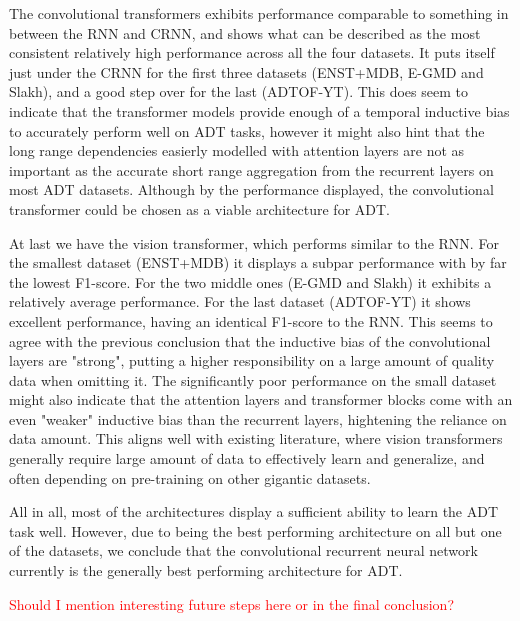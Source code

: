 The convolutional transformers exhibits performance comparable to something in between the \gls{RNN} and \gls{CRNN}, and shows what can be described as the most consistent relatively high performance across all the four datasets. It puts itself just under the \gls{CRNN} for the first three datasets (ENST+MDB, E-GMD and Slakh), and a good step over for the last (ADTOF-YT). This does seem to indicate that the transformer models provide enough of a temporal inductive bias to accurately perform well on \gls{ADT} tasks, however it might also hint that the long range dependencies easierly modelled with attention layers are not as important as the accurate short range aggregation from the recurrent layers on most \gls{ADT} datasets. Although by the performance displayed, the convolutional transformer could be chosen as a viable architecture for \gls{ADT}.

At last we have the vision transformer, which performs similar to the \gls{RNN}. For the smallest dataset (ENST+MDB) it displays a subpar performance with by far the lowest F1-score. For the two middle ones (E-GMD and Slakh) it exhibits a relatively average performance. For the last dataset (ADTOF-YT) it shows excellent performance, having an identical F1-score to the \gls{RNN}. This seems to agree with the previous conclusion that the inductive bias of the convolutional layers are "strong", putting a higher responsibility on a large amount of quality data when omitting it. The significantly poor performance on the small dataset might also indicate that the attention layers and transformer blocks come with an even "weaker" inductive bias than the recurrent layers, hightening the reliance on data amount. This aligns well with existing literature, where vision transformers generally require large amount of data to effectively learn and generalize, and often depending on pre-training on other gigantic datasets.

All in all, most of the architectures display a sufficient ability to learn the \gls{ADT} task well. However, due to being the best performing architecture on all but one of the datasets, we conclude that the convolutional recurrent neural network currently is the generally best performing architecture for \gls{ADT}.

\textcolor{red}{Should I mention interesting future steps here or in the final conclusion?}